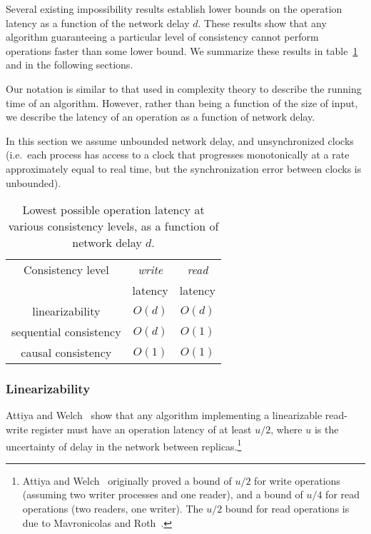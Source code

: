 \documentclass[a4paper,twocolumn,10pt]{article}
\begin{document}
Several existing impossibility results establish lower bounds on the operation latency as a function
of the network delay $d$. These results show that any algorithm guaranteeing a particular level of
consistency cannot perform operations faster than some lower bound. We summarize these results in
table~\ref{tab:op-latency} and in the following sections.

Our notation is similar to that used in complexity theory to describe the running time of an
algorithm. However, rather than being a function of the size of input, we describe the latency of an
operation as a function of network delay.

In this section we assume unbounded network delay, and unsynchronized clocks (i.e.\ each process has
access to a clock that progresses monotonically at a rate approximately equal to real time, but the
synchronization error between clocks is unbounded).

\begin{table}
    \centering
    \begin{tabular}{ccc}
        Consistency level      & \textit{write} & \textit{read} \\
                               & latency        & latency \\[3pt] \hline \noalign{\vspace{6pt}}
        linearizability        & $O(d)$         & $O(d)$  \\[3pt]
        sequential consistency & $O(d)$         & $O(1)$  \\[3pt]
        causal consistency     & $O(1)$         & $O(1)$  \\[3pt] \hline
    \end{tabular}
    \caption{Lowest possible operation latency at various consistency levels, as a function of
    network delay $d$.}
    \label{tab:op-latency}
\end{table}

\subsubsection{Linearizability}

Attiya and Welch~\cite{Attiya1994gw} show that any algorithm implementing a linearizable read-write
register must have an operation latency of at least $u/2$, where $u$ is the uncertainty of delay in
the network between replicas.\footnote{Attiya and Welch~\cite{Attiya1994gw} originally proved a
bound of $u/2$ for write operations (assuming two writer processes and one reader), and a bound of
$u/4$ for read operations (two readers, one writer). The $u/2$ bound for read operations is due to
Mavronicolas and Roth~\cite{Mavronicolas1999eb}.}
\end{document}
